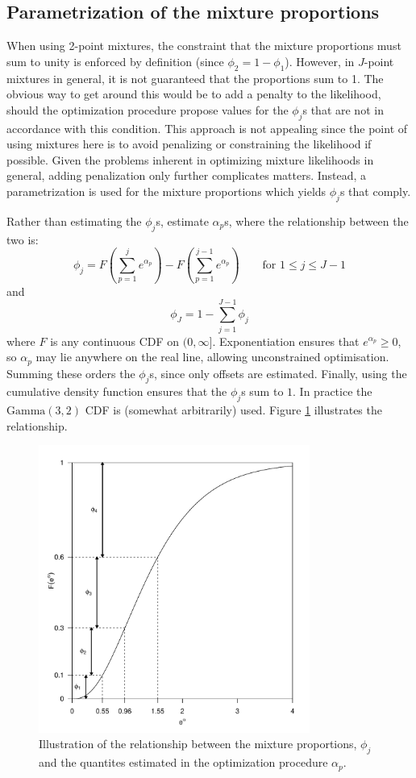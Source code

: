 \subsection{Parametrization of the mixture proportions}
\label{ds-mixpar}

When using 2-point mixtures, the constraint that the mixture proportions must sum to unity is enforced by definition (since $\phi_2=1-\phi_1$). However, in $J$-point mixtures in general, it is not guaranteed that the proportions sum to 1. The obvious way to get around this would be to add a penalty to the likelihood, should the optimization procedure propose values for the $\phi_j$s that are not in accordance with this condition. This approach is not appealing since the point of using mixtures here is to avoid penalizing or constraining the likelihood if possible. Given the problems inherent in optimizing mixture likelihoods in general, adding penalization only further complicates matters. Instead, a parametrization is used for the mixture proportions which yields $\phi_j$s that comply.

Rather than estimating the $\phi_j$s, estimate $\alpha_p$s, where the relationship between the two is:
\begin{equation*}
\phi_j = F(\sum_{p=1}^j e^{\alpha_p}) - F(\sum_{p=1}^{j-1} e^{\alpha_p}) \qquad \text{for } 1\leq j \leq J-1
\end{equation*}
and
\begin{equation*}
\phi_J = 1-\sum_{j=1}^{J-1} \phi_j
\end{equation*}
where $F$ is any continuous CDF on $(0,\infty]$. Exponentiation ensures that $e^{\alpha_p}\geq0$, so $\alpha_p$ may lie anywhere on the real line, allowing unconstrained optimisation. Summing these orders the $\phi_j$s, since only offsets are estimated. Finally, using the cumulative density function ensures that the $\phi_j$s sum to $1$. In practice the $\text{Gamma}(3,2)$ CDF is (somewhat arbitrarily) used. Figure \ref{mmds-phifig} illustrates the relationship.

\begin{figure}
\centering
\includegraphics[width=3.5in]{mix/figs/phidia.pdf}
\caption{Illustration of the relationship between the mixture proportions, $\phi_j$ and the quantites estimated in the optimization procedure $\alpha_p$.}
\label{mmds-phifig}
\end{figure}

